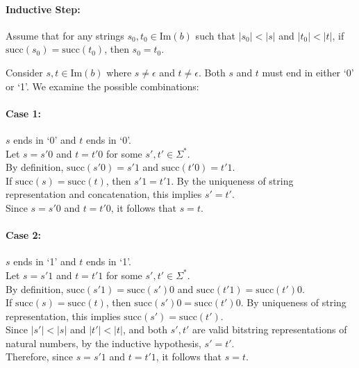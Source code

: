 \documentclass[12pt, a4paper]{article}
\begin{document}
\paragraph{Inductive Step:} Assume that for any strings \( s_0, t_0 \in \mathrm{Im}(b) \) such that \( |s_0| < |s| \) and \( |t_0| < |t| \), if \(\mathrm{succ}(s_0) = \mathrm{succ}(t_0)\), then \( s_0 = t_0 \).

Consider \( s, t \in \mathrm{Im}(b) \) where \( s \neq \epsilon \) and \( t \neq \epsilon \). Both \( s \) and \( t \) must end in either `0' or `1'. We examine the possible combinations:

\paragraph{Case 1:} \( s \) ends in `0' and \( t \) ends in `0'. \\
Let \( s = s'0 \) and \( t = t'0 \) for some \( s', t' \in \Sigma^* \). \\
By definition, \(\mathrm{succ}(s'0) = s'1\) and \(\mathrm{succ}(t'0) = t'1\). \\
If \(\mathrm{succ}(s) = \mathrm{succ}(t)\), then \( s'1 = t'1 \). By the uniqueness of string representation and concatenation, this implies \( s' = t' \). \\
Since \( s = s'0 \) and \( t = t'0 \), it follows that \( s = t \).

\paragraph{Case 2:} \( s \) ends in `1' and \( t \) ends in `1'. \\
Let \( s = s'1 \) and \( t = t'1 \) for some \( s', t' \in \Sigma^* \). \\
By definition, \(\mathrm{succ}(s'1) = \mathrm{succ}(s')0\) and \(\mathrm{succ}(t'1) = \mathrm{succ}(t')0\). \\
If \(\mathrm{succ}(s) = \mathrm{succ}(t)\), then \(\mathrm{succ}(s')0 = \mathrm{succ}(t')0\). By uniqueness of string representation, this implies \(\mathrm{succ}(s') = \mathrm{succ}(t')\). \\
Since \( |s'| < |s| \) and \( |t'| < |t| \), and both \( s', t' \) are valid bitstring representations of natural numbers, by the inductive hypothesis, \( s' = t' \). \\
Therefore, since \( s = s'1 \) and \( t = t'1 \), it follows that \( s = t \).
\end{document}
